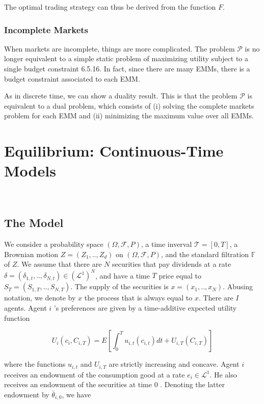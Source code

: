 \documentclass[\topdir/lecture\_notes.tex]{subfiles}
\begin{document}
The optimal trading strategy can thus be derived from the function \(F\).




\subsubsection{Incomplete Markets}
When markets are incomplete, things are more complicated. The problem \(\mathcal{P}\) is no longer equivalent to a simple static problem of maximizing utility subject to a single budget constraint 6.5.16. In fact, since there are many EMMs, there is a budget constraint associated to each EMM.

As in discrete time, we can show a duality result. This is that the problem \(\mathcal{P}\) is equivalent to a dual problem, which consists of (i) solving the complete markets problem for each EMM and (ii) minimizing the maximum value over all EMMs.


\section{Equilibrium: Continuous-Time Models}
\

\subsection{The Model}
We consider a probability space \((\Omega, \mathcal{F}, P)\), a time inverval \(\mathcal{T}=[0, T]\), a Brownian motion \(Z=\left(Z_{1}, . ., Z_{d}\right)\) on \((\Omega, \mathcal{F}, P)\), and the standard filtration \(\mathbb{F}\) of \(Z\). We assume that there are \(N\) securities that pay dividends at a rate \(\delta=\left(\delta_{1, t}, . ., \delta_{N, t}\right) \in\left(\mathcal{L}^{1}\right)^{N}\), and have a time \(T\) price equal to \(S_{T}=\left(S_{1, T}, . ., S_{N, T}\right)\). The supply of the securities is \(x=\left(x_{1}, . ., x_{N}\right)\). Abusing notation, we denote by \(x\) the process that is always equal to \(x\). There are \(I\) agents. Agent \(i\) 's preferences are given by a time-additive expected utility function

\begin{equation}
U_{i}\left(c_{i}, C_{i, T}\right)=E\left[\int_{0}^{T} u_{i, t}\left(c_{i, t}\right) d t+U_{i, T}\left(C_{i, T}\right)\right]
\end{equation}

where the functions \(u_{i, t}\) and \(U_{i, T}\) are strictly increasing and concave. Agent \(i\) receives an endowment of the consumption good at a rate \(e_{i} \in \mathcal{L}^{1}\). He also receives an endowment of the securities at time 0 . Denoting the latter endowment by \(\bar{\theta}_{i, 0}\), we have
\end{document}
